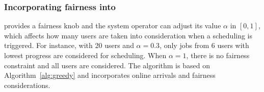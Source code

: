 






\subsubsection{Incorporating fairness into \name}


\name provides a fairness knob and the system operator can adjust its value $\alpha$ in $[0,1]$, which affects how many users are taken into consideration when a scheduling is triggered. For instance, with 20 users and $\alpha = 0.3$, only jobs from 6 users with lowest progress are considered for scheduling. When $\alpha=1$, there is no fairness constraint and all users are considered. The \name algorithm is based on Algorithm~\ref{alg:greedy} and incorporates online arrivals and fairness considerations. 

